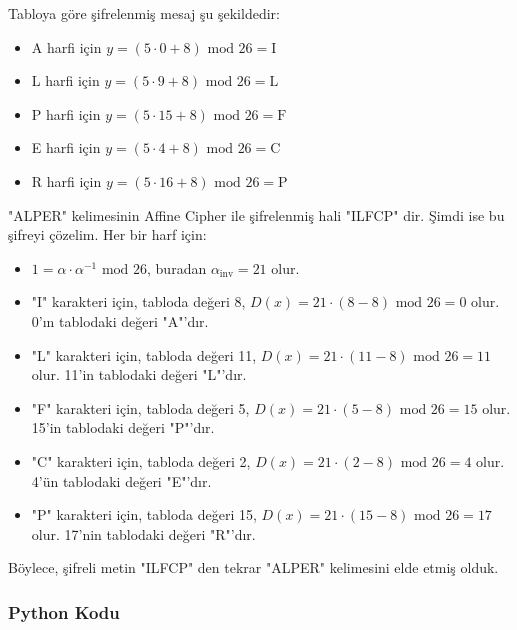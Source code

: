 Tabloya göre şifrelenmiş mesaj şu şekildedir:

\begin{itemize}
    \item A harfi için $y = (5 \cdot 0 + 8) \text{ mod } 26 = \text{I}$
    \item L harfi için $y = (5 \cdot 9 + 8) \text{ mod } 26 = \text{L}$
    \item P harfi için $y = (5 \cdot 15 + 8) \text{ mod } 26 = \text{F}$
    \item E harfi için $y = (5 \cdot 4 + 8) \text{ mod } 26 = \text{C}$
    \item R harfi için $y = (5 \cdot 16 + 8) \text{ mod } 26 = \text{P}$
\end{itemize}

"ALPER" kelimesinin Affine Cipher ile şifrelenmiş hali "ILFCP" dir. Şimdi ise bu şifreyi çözelim. Her bir harf için:

\begin{itemize}
    \item $1 = \alpha \cdot \alpha^{-1} \text{ mod } 26$, buradan $\alpha_{\text{inv}} = 21$ olur.
    \item "I" karakteri için, tabloda değeri 8, $D(x) = 21 \cdot (8 - 8) \text{ mod } 26 = 0$ olur. 0'ın tablodaki değeri "A"'dır.
    \item "L" karakteri için, tabloda değeri 11, $D(x) = 21 \cdot (11 - 8) \text{ mod } 26 = 11$ olur. 11'in tablodaki değeri "L"'dır.
    \item "F" karakteri için, tabloda değeri 5, $D(x) = 21 \cdot (5 - 8) \text{ mod } 26 = 15$ olur. 15'in tablodaki değeri "P"'dır.
    \item "C" karakteri için, tabloda değeri 2, $D(x) = 21 \cdot (2 - 8) \text{ mod } 26 = 4$ olur. 4'ün tablodaki değeri "E"'dır.
    \item "P" karakteri için, tabloda değeri 15, $D(x) = 21 \cdot (15 - 8) \text{ mod } 26 = 17$ olur. 17'nin tablodaki değeri "R"'dır.
\end{itemize}

Böylece, şifreli metin "ILFCP" den tekrar "ALPER" kelimesini elde etmiş olduk. 

\subsubsection{Python Kodu}

